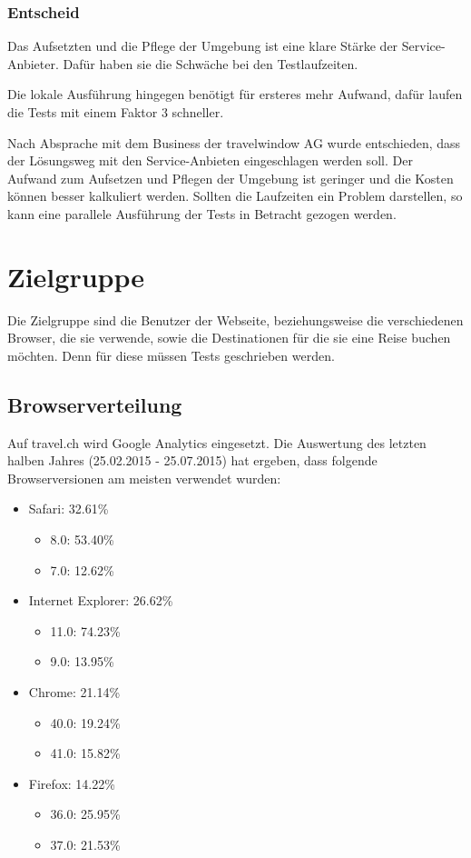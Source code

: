 \subsubsection{Entscheid}
Das Aufsetzten und die Pflege der Umgebung ist eine klare Stärke der Service-Anbieter. Dafür haben sie die Schwäche bei den Testlaufzeiten. 

Die lokale Ausführung hingegen benötigt für ersteres mehr Aufwand, dafür laufen die Tests mit einem Faktor 3 schneller.

Nach Absprache mit dem Business der travelwindow AG wurde entschieden, dass der Lösungsweg mit den Service-Anbieten eingeschlagen werden soll. Der Aufwand zum Aufsetzen und Pflegen der Umgebung ist geringer und die Kosten können besser kalkuliert werden. Sollten die Laufzeiten ein Problem darstellen, so kann eine parallele Ausführung der Tests in Betracht gezogen werden. 

\section{Zielgruppe}
\label{sec:Recherche:Zielgruppe}
Die Zielgruppe sind die Benutzer der Webseite, beziehungsweise die verschiedenen Browser, die sie verwende, sowie die Destinationen für die sie eine Reise buchen möchten. Denn für diese müssen Tests geschrieben werden.

\subsection{Browserverteilung}
Auf travel.ch wird Google Analytics eingesetzt. Die Auswertung des letzten halben Jahres (25.02.2015 - 25.07.2015) hat ergeben, dass folgende Browserversionen am meisten verwendet wurden:
\begin{itemize}
\item Safari: 32.61\%
	\begin{itemize}
			\item 8.0: 53.40\%
			\item 7.0: 12.62\%
	\end{itemize}
\item Internet Explorer: 26.62\%
	\begin{itemize}
			\item 11.0: 74.23\%
			\item 9.0: 13.95\%
	\end{itemize}
\item Chrome: 21.14\%
	\begin{itemize}
			\item 40.0: 19.24\%
			\item 41.0: 15.82\%
	\end{itemize}
\item Firefox: 14.22\%
	\begin{itemize}
			\item 36.0: 25.95\%
			\item 37.0: 21.53\%
	\end{itemize}
\end{itemize}

